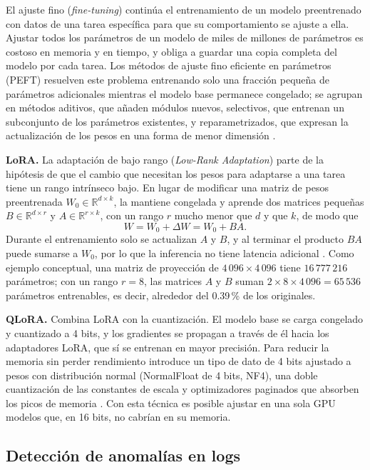 El ajuste fino (\textit{fine-tuning}) continúa el entrenamiento de un modelo preentrenado con datos de una tarea específica para que su comportamiento se ajuste a ella. Ajustar todos los parámetros de un modelo de miles de millones de parámetros es costoso en memoria y en tiempo, y obliga a guardar una copia completa del modelo por cada tarea. Los métodos de ajuste fino eficiente en parámetros (PEFT) resuelven este problema entrenando solo una fracción pequeña de parámetros adicionales mientras el modelo base permanece congelado; se agrupan en métodos aditivos, que añaden módulos nuevos, selectivos, que entrenan un subconjunto de los parámetros existentes, y reparametrizados, que expresan la actualización de los pesos en una forma de menor dimensión \cite{han2024_peft_survey}.

\textbf{LoRA.} La adaptación de bajo rango (\textit{Low-Rank Adaptation}) parte de la hipótesis de que el cambio que necesitan los pesos para adaptarse a una tarea tiene un rango intrínseco bajo. En lugar de modificar una matriz de pesos preentrenada $W_0 \in \mathbb{R}^{d \times k}$, la mantiene congelada y aprende dos matrices pequeñas $B \in \mathbb{R}^{d \times r}$ y $A \in \mathbb{R}^{r \times k}$, con un rango $r$ mucho menor que $d$ y que $k$, de modo que
\begin{equation}
W = W_0 + \Delta W = W_0 + BA.
\end{equation}
Durante el entrenamiento solo se actualizan $A$ y $B$, y al terminar el producto $BA$ puede sumarse a $W_0$, por lo que la inferencia no tiene latencia adicional \cite{hu2022_lora}. Como ejemplo conceptual, una matriz de proyección de $4\,096 \times 4\,096$ tiene $16\,777\,216$ parámetros; con un rango $r = 8$, las matrices $A$ y $B$ suman $2 \times 8 \times 4\,096 = 65\,536$ parámetros entrenables, es decir, alrededor del 0.39\,\% de los originales.

\textbf{QLoRA.} Combina LoRA con la cuantización. El modelo base se carga congelado y cuantizado a 4 bits, y los gradientes se propagan a través de él hacia los adaptadores LoRA, que sí se entrenan en mayor precisión. Para reducir la memoria sin perder rendimiento introduce un tipo de dato de 4 bits ajustado a pesos con distribución normal (NormalFloat de 4 bits, NF4), una doble cuantización de las constantes de escala y optimizadores paginados que absorben los picos de memoria \cite{dettmers2023_qlora}. Con esta técnica es posible ajustar en una sola GPU modelos que, en 16 bits, no cabrían en su memoria.

\subsection{Detección de anomalías en logs}\label{sec:mt_anomalias}

